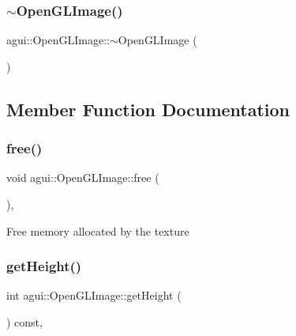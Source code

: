\subsubsection{\texorpdfstring{$\sim$\+Open\+G\+L\+Image()}{~OpenGLImage()}}
{\footnotesize\ttfamily agui\+::\+Open\+G\+L\+Image\+::$\sim$\+Open\+G\+L\+Image (\begin{DoxyParamCaption}{ }\end{DoxyParamCaption})\hspace{0.3cm}{\ttfamily [virtual]}}



\subsection{Member Function Documentation}
\mbox{\label{classagui_1_1_open_g_l_image_ac6012525bdebca732f9ee527b4f385f2}} 
\subsubsection{\texorpdfstring{free()}{free()}}
{\footnotesize\ttfamily void agui\+::\+Open\+G\+L\+Image\+::free (\begin{DoxyParamCaption}{ }\end{DoxyParamCaption})\hspace{0.3cm}{\ttfamily [override]}, {\ttfamily [virtual]}}

Free memory allocated by the texture \mbox{\label{classagui_1_1_open_g_l_image_a6f08a29892fefbfda75f62cabcf03661}} 
\subsubsection{\texorpdfstring{get\+Height()}{getHeight()}}
{\footnotesize\ttfamily int agui\+::\+Open\+G\+L\+Image\+::get\+Height (\begin{DoxyParamCaption}{ }\end{DoxyParamCaption}) const\hspace{0.3cm}{\ttfamily [override]}, {\ttfamily [virtual]}}


